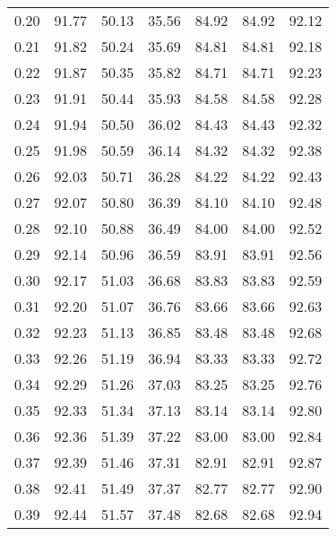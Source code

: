 \begin{tabular}{|c|c|c|c|c|c|c|}
      0.20 &     91.77 &     50.13 &      35.56 &   84.92 &      84.92 &         92.12 \\
      0.21 &     91.82 &     50.24 &      35.69 &   84.81 &      84.81 &         92.18 \\
      0.22 &     91.87 &     50.35 &      35.82 &   84.71 &      84.71 &         92.23 \\
      0.23 &     91.91 &     50.44 &      35.93 &   84.58 &      84.58 &         92.28 \\
      0.24 &     91.94 &     50.50 &      36.02 &   84.43 &      84.43 &         92.32 \\
      0.25 &     91.98 &     50.59 &      36.14 &   84.32 &      84.32 &         92.38 \\
      0.26 &     92.03 &     50.71 &      36.28 &   84.22 &      84.22 &         92.43 \\
      0.27 &     92.07 &     50.80 &      36.39 &   84.10 &      84.10 &         92.48 \\
      0.28 &     92.10 &     50.88 &      36.49 &   84.00 &      84.00 &         92.52 \\
      0.29 &     92.14 &     50.96 &      36.59 &   83.91 &      83.91 &         92.56 \\
      0.30 &     92.17 &     51.03 &      36.68 &   83.83 &      83.83 &         92.59 \\
      0.31 &     92.20 &     51.07 &      36.76 &   83.66 &      83.66 &         92.63 \\
      0.32 &     92.23 &     51.13 &      36.85 &   83.48 &      83.48 &         92.68 \\
      0.33 &     92.26 &     51.19 &      36.94 &   83.33 &      83.33 &         92.72 \\
      0.34 &     92.29 &     51.26 &      37.03 &   83.25 &      83.25 &         92.76 \\
      0.35 &     92.33 &     51.34 &      37.13 &   83.14 &      83.14 &         92.80 \\
      0.36 &     92.36 &     51.39 &      37.22 &   83.00 &      83.00 &         92.84 \\
      0.37 &     92.39 &     51.46 &      37.31 &   82.91 &      82.91 &         92.87 \\
      0.38 &     92.41 &     51.49 &      37.37 &   82.77 &      82.77 &         92.90 \\
      0.39 &     92.44 &     51.57 &      37.48 &   82.68 &      82.68 &         92.94 \\

\end{tabular}

